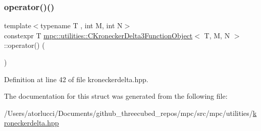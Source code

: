 \subsubsection{\texorpdfstring{operator()()}{operator()()}}
{\footnotesize\ttfamily template$<$typename T , int M, int N$>$ \\
constexpr T \mbox{\hyperlink{structmpc_1_1utilities_1_1_c_kronecker_delta3_function_object}{mpc\+::utilities\+::\+C\+Kronecker\+Delta3\+Function\+Object}}$<$ T, M, N $>$\+::operator() (\begin{DoxyParamCaption}{ }\end{DoxyParamCaption})\hspace{0.3cm}{\ttfamily [inline]}}



Definition at line 42 of file kroneckerdelta.\+hpp.



The documentation for this struct was generated from the following file\+:\begin{DoxyCompactItemize}
\item 
/\+Users/atorlucci/\+Documents/github\+\_\+threecubed\+\_\+repos/mpc/src/mpc/utilities/\mbox{\hyperlink{kroneckerdelta_8hpp}{kroneckerdelta.\+hpp}}\end{DoxyCompactItemize}
